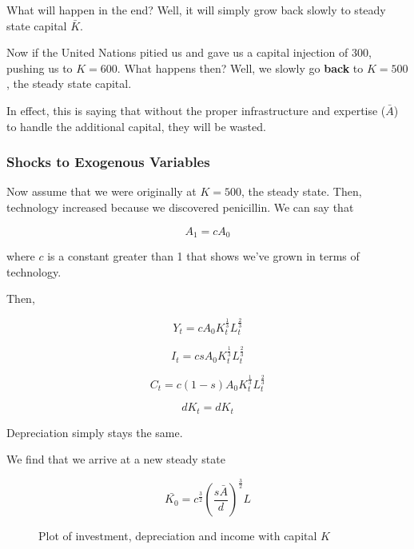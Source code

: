 \documentclass[11pt]{scrartcl}
\newcommand{\oneth}{\ensuremath{\frac{1}{3}}}
\newcommand{\twoth}{\ensuremath{\frac{2}{3}}}
\begin{document}
What will happen in the end? Well, it will simply grow back slowly to steady state capital $\bar{K}$. 

Now if the United Nations pitied us and gave us a capital injection of 300, pushing us to $K=600$. What happens then? Well, we slowly go \textbf{back} to $K=500$, the steady state capital.

In effect, this is saying that without the proper infrastructure and expertise ($\bar{A}$) to handle the additional capital, they will be wasted.

\subsubsection{Shocks to Exogenous Variables}

Now assume that we were originally at $K = 500$, the steady state. Then, technology increased because we discovered penicillin. We can say that

\[A_1 = cA_0\] 

where $c$ is a constant greater than 1 that shows we've grown in terms of technology.

Then,

\[Y_t = cA_0K_t^\oneth L_t^\twoth \]

\[I_t = csA_0K_t^\oneth L_t^\twoth\]

\[C_t =  c(1-s)A_0K_t^\oneth L_t^\twoth\]

\[dK_t = dK_t\] 

Depreciation simply stays the same. 

We find that we arrive at a new steady state

\[\bar{K_0} = c^{\frac{3}{2}}\left(\frac{s\bar{A}}{d}\right)^{\frac{3}{2}}L \]

\begin{figure}[ht!]
\centering
{}
\caption{Plot of investment, depreciation and income with capital $K$}
\end{figure}
\end{document}

